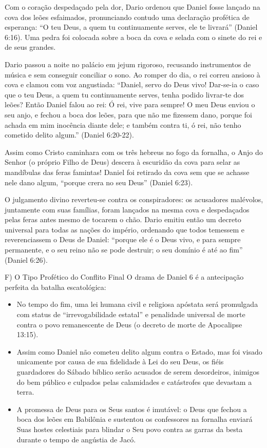 Com o coração despedaçado pela dor, Dario ordenou que Daniel fosse lançado na cova dos leões esfaimados, pronunciando contudo uma declaração profética de esperança: ``O teu Deus, a quem tu continuamente serves, ele te livrará'' (Daniel 6:16). Uma pedra foi colocada sobre a boca da cova e selada com o sinete do rei e de seus grandes.

Dario passou a noite no palácio em jejum rigoroso, recusando instrumentos de música e sem conseguir conciliar o sono. Ao romper do dia, o rei correu ansioso à cova e clamou com voz angustiada:
``Daniel, servo do Deus vivo! Dar-se-ia o caso que o teu Deus, a quem tu continuamente serves, tenha podido livrar-te dos leões? Então Daniel falou ao rei: Ó rei, vive para sempre! O meu Deus enviou o seu anjo, e fechou a boca dos leões, para que não me fizessem dano, porque foi achada em mim inocência diante dele; e também contra ti, ó rei, não tenho cometido delito algum.'' (Daniel 6:20-22).

Assim como Cristo caminhara com os três hebreus no fogo da fornalha, o Anjo do Senhor (o próprio Filho de Deus) descera à escuridão da cova para selar as mandíbulas das feras famintas! Daniel foi retirado da cova sem que se achasse nele dano algum, ``porque crera no seu Deus'' (Daniel 6:23).

O julgamento divino reverteu-se contra os conspiradores: os acusadores malévolos, juntamente com suas famílias, foram lançados na mesma cova e despedaçados pelas feras antes mesmo de tocarem o chão. Dario emitiu então um decreto universal para todas as nações do império, ordenando que todos temessem e reverenciassem o Deus de Daniel: ``porque ele é o Deus vivo, e para sempre permanente, e o seu reino não se pode destruir; o seu domínio é até ao fim'' (Daniel 6:26).

F) O Tipo Profético do Conflito Final
O drama de Daniel 6 é a antecipação perfeita da batalha escatológica:
\begin{itemize}
  \item No tempo do fim, uma lei humana civil e religiosa apóstata será promulgada com status de ``irrevogabilidade estatal'' e penalidade universal de morte contra o povo remanescente de Deus (o decreto de morte de Apocalipse 13:15).
  \item Assim como Daniel não cometeu delito algum contra o Estado, mas foi visado unicamente por causa de sua fidelidade à Lei do seu Deus, os fiéis guardadores do Sábado bíblico serão acusados de serem desordeiros, inimigos do bem público e culpados pelas calamidades e catástrofes que devastam a terra.
  \item A promessa de Deus para os Seus santos é imutável: o Deus que fechou a boca dos leões em Babilônia e sustentou os confessores na fornalha enviará Suas hostes celestiais para blindar o Seu povo contra as garras da besta durante o tempo de angústia de Jacó.
\end{itemize}




